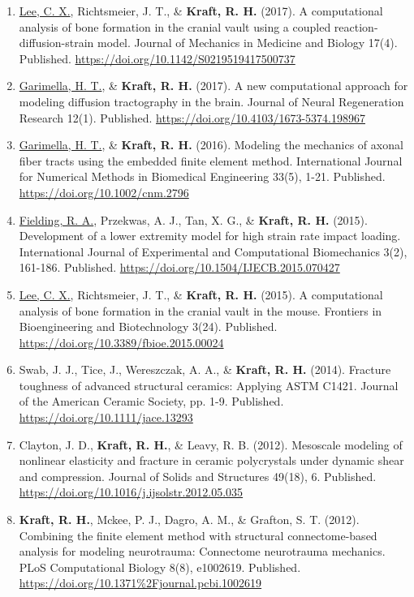 \documentclass[a4paper,10pt]{article}
\begin{document}
\begin{enumerate}
 \item	\underline{Lee, C. X.}, Richtsmeier, J. T., \&
 \textbf{\textbf{Kraft,} R. H.} (2017). A computational analysis of bone formation in the cranial vault using a coupled reaction-diffusion-strain model. Journal of Mechanics in Medicine and Biology 17(4). Published. \url{https://doi.org/10.1142/S0219519417500737}
 \item	\underline{Garimella, H. T.}, \&
 \textbf{\textbf{Kraft,} R. H.} (2017). A new computational approach for modeling diffusion tractography in the brain. Journal of Neural Regeneration Research 12(1). Published. \url{https://doi.org/10.4103/1673-5374.198967}
 \item	\underline{Garimella, H. T.}, \&
 \textbf{\textbf{Kraft,} R. H.} (2016). Modeling the mechanics of axonal fiber tracts using the embedded finite element method. International Journal for Numerical Methods in Biomedical Engineering 33(5), 1-21. Published. \url{https://doi.org/10.1002/cnm.2796}
 \item	\underline{Fielding, R. A.}, Przekwas, A. J., Tan, X. G., \&
 \textbf{\textbf{Kraft,} R. H.} (2015). Development of a lower extremity model for high strain rate impact loading. International Journal of Experimental and Computational Biomechanics 3(2), 161-186. Published. \url{https://doi.org/10.1504/IJECB.2015.070427}
 \item	\underline{Lee, C. X.}, Richtsmeier, J. T., \&
 \textbf{\textbf{Kraft,} R. H.} (2015). A computational analysis of bone formation in the cranial vault in the mouse. Frontiers in Bioengineering and Biotechnology 3(24). Published. \url{https://doi.org/10.3389/fbioe.2015.00024}
 \item	Swab, J. J., Tice, J., Wereszczak, A. A., \&
 \textbf{\textbf{Kraft,} R. H.} (2014). Fracture toughness of advanced structural ceramics: Applying ASTM C1421. Journal of the American Ceramic Society, pp. 1-9. Published. \url{https://doi.org/10.1111/jace.13293}
 \item	Clayton, J. D., \textbf{\textbf{Kraft,} R. H.}, \&
 Leavy, R. B. (2012). Mesoscale modeling of nonlinear elasticity and fracture in ceramic polycrystals under dynamic shear and compression. Journal of Solids and Structures 49(18), 6. Published. \url{https://doi.org/10.1016/j.ijsolstr.2012.05.035}
 \item	\textbf{\textbf{Kraft,} R. H.}, Mckee, P. J., Dagro, A. M., \&
 Grafton, S. T. (2012). Combining the finite element method with structural connectome-based analysis for modeling neurotrauma: Connectome neurotrauma mechanics. PLoS Computational Biology 8(8), e1002619. Published. \url{https://doi.org/10.1371%2Fjournal.pcbi.1002619}

\end{enumerate}
\end{document}

